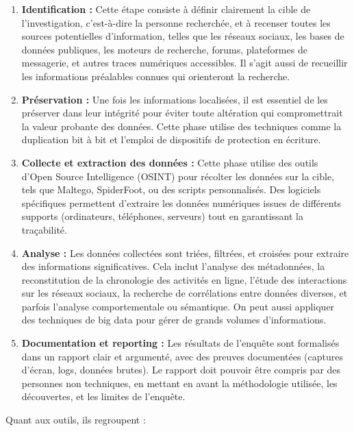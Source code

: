 \documentclass[12pt, a4paper]{article}
\begin{document}
	\begin{enumerate}[leftmargin=*]
		\item \textbf{Identification :} Cette étape consiste à définir clairement la cible de l'investigation, c'est-à-dire la personne recherchée, et à recenser toutes les sources potentielles d'information, telles que les réseaux sociaux, les bases de données publiques, les moteurs de recherche, forums, plateformes de messagerie, et autres traces numériques accessibles. Il s'agit aussi de recueillir les informations préalables connues qui orienteront la recherche.
		
		\item \textbf{Préservation :} Une fois les informations localisées, il est essentiel de les préserver dans leur intégrité pour éviter toute altération qui compromettrait la valeur probante des données. Cette phase utilise des techniques comme la duplication bit à bit et l'emploi de dispositifs de protection en écriture.
		
		\item \textbf{Collecte et extraction des données :} Cette phase utilise des outils d'Open Source Intelligence (OSINT) pour récolter les données sur la cible, tels que Maltego, SpiderFoot, ou des scripts personnalisés. Des logiciels spécifiques permettent d'extraire les données numériques issues de différents supports (ordinateurs, téléphones, serveurs) tout en garantissant la traçabilité.
		
		\item \textbf{Analyse :} Les données collectées sont triées, filtrées, et croisées pour extraire des informations significatives. Cela inclut l'analyse des métadonnées, la reconstitution de la chronologie des activités en ligne, l'étude des interactions sur les réseaux sociaux, la recherche de corrélations entre données diverses, et parfois l'analyse comportementale ou sémantique. On peut aussi appliquer des techniques de big data pour gérer de grands volumes d'informations.
		
		\item \textbf{Documentation et reporting :} Les résultats de l'enquête sont formalisés dans un rapport clair et argumenté, avec des preuves documentées (captures d'écran, logs, données brutes). Le rapport doit pouvoir être compris par des personnes non techniques, en mettant en avant la méthodologie utilisée, les découvertes, et les limites de l'enquête.
	\end{enumerate}
	
	Quant aux outils, ils regroupent :
	
\end{document}
